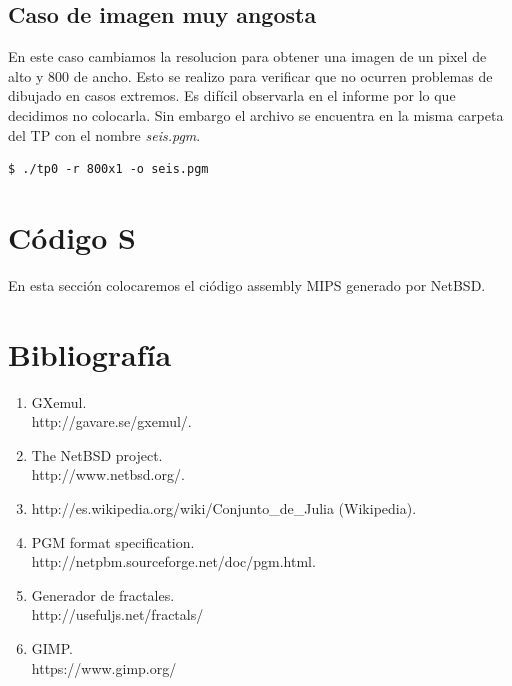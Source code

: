\documentclass[a4paper,10pt]{article}
\begin{document}
\newpage

\subsection{Caso de imagen muy angosta}
En este caso cambiamos la resolucion para obtener una imagen de un pixel
de alto y 800 de ancho. \newline
Esto se realizo para verificar que no ocurren problemas de dibujado en casos extremos.
Es dif\'{i}cil observarla en el informe por lo que decidimos no colocarla. Sin embargo el archivo se encuentra en la misma carpeta del TP con el nombre \textit{seis.pgm}.

\begin{lstlisting}[frame=single]
$ ./tp0 -r 800x1 -o seis.pgm
\end{lstlisting}

\section{C\'{o}digo S}

En esta secci\'{o}n colocaremos el ci\'{o}digo assembly MIPS generado por NetBSD.

%

\section{Bibliograf\'{i}a}
\begin{enumerate}
\item GXemul. \\ http://gavare.se/gxemul/.
\item The NetBSD project. \\
	http://www.netbsd.org/.
\item http://es.wikipedia.org/wiki/Conjunto\_de\_Julia (Wikipedia).
\item PGM format specification.\\
	http://netpbm.sourceforge.net/doc/pgm.html.
\item Generador de fractales. \\
	http://usefuljs.net/fractals/
\item GIMP. \\
	https://www.gimp.org/
\end{enumerate}
\end{document}
